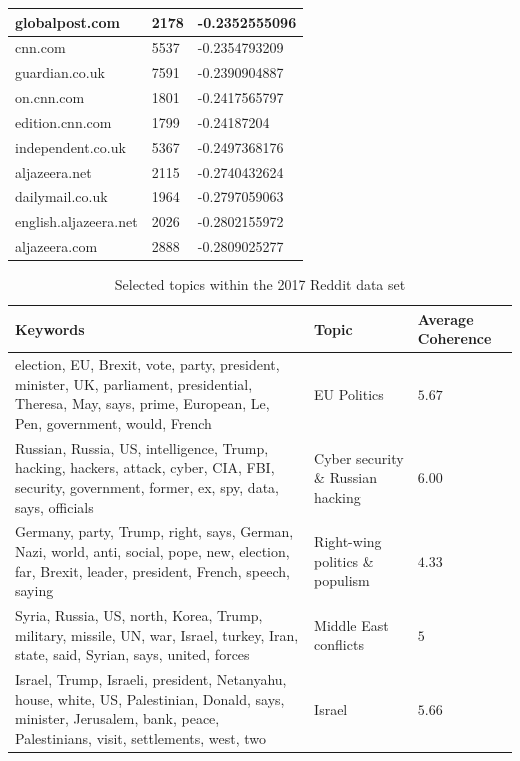 \documentclass[final]{ieee}
\begin{document}
\begin{table}[htb]
\begin{tabularx}{\textwidth}{X|l|l}
globalpost.com & 2178 & -0.2352555096 \\ \hline
cnn.com & 5537 & -0.2354793209 \\ \hline
guardian.co.uk & 7591 & -0.2390904887 \\ \hline
on.cnn.com & 1801 & -0.2417565797 \\ \hline
edition.cnn.com & 1799 & -0.24187204 \\ \hline
independent.co.uk & 5367 & -0.2497368176 \\ \hline
aljazeera.net & 2115 & -0.2740432624 \\ \hline
dailymail.co.uk & 1964 & -0.2797059063 \\ \hline
english.aljazeera.net & 2026 & -0.2802155972 \\ \hline
aljazeera.com & 2888 & -0.2809025277 \\
\end{tabularx}
\label{tab:averageSentiments}
\end{table}

\begin{table}[htb]
\caption{Selected topics within the 2017 Reddit data set}
\begin{tabularx}{\textwidth}{X|l|l}
Keywords & Topic & Average Coherence \\ \hline
election, EU, Brexit, vote, party, president, minister, UK, parliament, presidential, Theresa, May, says, prime, European, Le, Pen, government, would, French & EU Politics & $5.67$ \\ \hline
Russian, Russia, US, intelligence, Trump, hacking, hackers, attack, cyber, CIA, FBI, security, government, former, ex, spy, data, says, officials & Cyber security \& Russian hacking & $6.00$ \\ \hline
Germany, party, Trump, right, says, German, Nazi, world, anti, social, pope, new, election, far, Brexit, leader, president, French, speech, saying & Right-wing politics \& populism & $4.33$ \\ \hline
Syria, Russia, US, north, Korea, Trump, military, missile, UN, war, Israel, turkey, Iran, state, said, Syrian, says, united, forces & Middle East conflicts & $5$ \\ \hline
Israel, Trump, Israeli, president, Netanyahu, house, white, US, Palestinian, Donald, says, minister, Jerusalem, bank, peace, Palestinians, visit, settlements, west, two & Israel & $5.66$ \\
\end{tabularx}
\label{tab:topics}
\end{table}
\end{document}
